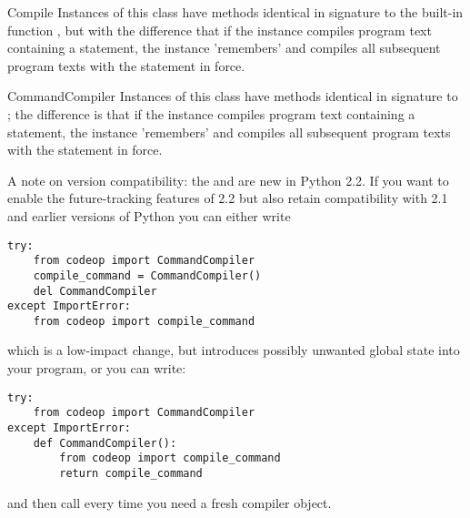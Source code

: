 \begin{classdesc}{Compile}{}
Instances of this class have  methods identical in
signature to the built-in function , but with the
difference that if the instance compiles program text containing a
 statement, the instance 'remembers' and compiles
all subsequent program texts with the statement in force.
\end{classdesc}

\begin{classdesc}{CommandCompiler}{}
Instances of this class have  methods identical in
signature to ; the difference is that if
the instance compiles program text containing a 
statement, the instance 'remembers' and compiles all subsequent
program texts with the statement in force.
\end{classdesc}

A note on version compatibility: the  and
 are new in Python 2.2.  If you want to enable
the future-tracking features of 2.2 but also retain compatibility with
2.1 and earlier versions of Python you can either write

\begin{verbatim}
try:
    from codeop import CommandCompiler
    compile_command = CommandCompiler()
    del CommandCompiler
except ImportError:
    from codeop import compile_command
\end{verbatim}

which is a low-impact change, but introduces possibly unwanted global
state into your program, or you can write:

\begin{verbatim}
try:
    from codeop import CommandCompiler
except ImportError:
    def CommandCompiler():
        from codeop import compile_command
        return compile_command
\end{verbatim}

and then call  every time you need a fresh
compiler object.

